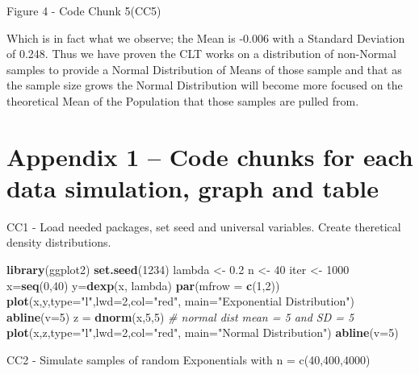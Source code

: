 \documentclass[]{article}
\newenvironment{Shaded}{\begin{snugshade}}{\end{snugshade}}
\newcommand{\KeywordTok}[1]{\textcolor[rgb]{0.13,0.29,0.53}{\textbf{{#1}}}}
\newcommand{\DataTypeTok}[1]{\textcolor[rgb]{0.13,0.29,0.53}{{#1}}}
\newcommand{\DecValTok}[1]{\textcolor[rgb]{0.00,0.00,0.81}{{#1}}}
\newcommand{\FloatTok}[1]{\textcolor[rgb]{0.00,0.00,0.81}{{#1}}}
\newcommand{\StringTok}[1]{\textcolor[rgb]{0.31,0.60,0.02}{{#1}}}
\newcommand{\CommentTok}[1]{\textcolor[rgb]{0.56,0.35,0.01}{\textit{{#1}}}}
\newcommand{\NormalTok}[1]{{#1}}
\begin{document}
Figure 4 - Code Chunk 5(CC5)

Which is in fact what we observe; the Mean is -0.006 with a Standard
Deviation of 0.248. Thus we have proven the CLT works on a distribution
of non-Normal samples to provide a Normal Distribution of Means of those
sample and that as the sample size grows the Normal Distribution will
become more focused on the theoretical Mean of the Population that those
samples are pulled from.

\section{Appendix 1 -- Code chunks for each data simulation, graph and
table}\label{appendix-1-code-chunks-for-each-data-simulation-graph-and-table}

CC1 - Load needed packages, set seed and universal variables. Create
theretical density distributions.

\begin{Shaded}
\begin{Highlighting}[]
\KeywordTok{library}\NormalTok{(ggplot2)}
\KeywordTok{set.seed}\NormalTok{(}\DecValTok{1234}\NormalTok{)}
\NormalTok{lambda <-}\StringTok{ }\FloatTok{0.2}
\NormalTok{n <-}\StringTok{ }\DecValTok{40}
\NormalTok{iter <-}\StringTok{ }\DecValTok{1000}
\NormalTok{x=}\KeywordTok{seq}\NormalTok{(}\DecValTok{0}\NormalTok{,}\DecValTok{40}\NormalTok{)}
\NormalTok{y=}\KeywordTok{dexp}\NormalTok{(x, lambda)}
\KeywordTok{par}\NormalTok{(}\DataTypeTok{mfrow =} \KeywordTok{c}\NormalTok{(}\DecValTok{1}\NormalTok{,}\DecValTok{2}\NormalTok{))}
\KeywordTok{plot}\NormalTok{(x,y,}\DataTypeTok{type=}\StringTok{"l"}\NormalTok{,}\DataTypeTok{lwd=}\DecValTok{2}\NormalTok{,}\DataTypeTok{col=}\StringTok{"red"}\NormalTok{, }\DataTypeTok{main=}\StringTok{"Exponential Distribution"}\NormalTok{)}
\KeywordTok{abline}\NormalTok{(}\DataTypeTok{v=}\DecValTok{5}\NormalTok{)}
\NormalTok{z =}\StringTok{ }\KeywordTok{dnorm}\NormalTok{(x,}\DecValTok{5}\NormalTok{,}\DecValTok{5}\NormalTok{) }\CommentTok{# normal dist mean = 5 and SD = 5}
\KeywordTok{plot}\NormalTok{(x,z,}\DataTypeTok{type=}\StringTok{"l"}\NormalTok{,}\DataTypeTok{lwd=}\DecValTok{2}\NormalTok{,}\DataTypeTok{col=}\StringTok{"red"}\NormalTok{, }\DataTypeTok{main=}\StringTok{"Normal Distribution"}\NormalTok{)}
\KeywordTok{abline}\NormalTok{(}\DataTypeTok{v=}\DecValTok{5}\NormalTok{)}
\end{Highlighting}
\end{Shaded}

CC2 - Simulate samples of random Exponentials with n = c(40,400,4000)
\end{document}
